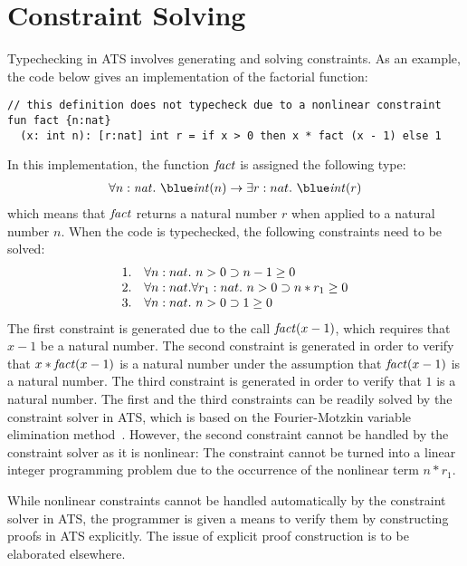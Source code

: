\section{Constraint Solving}
Typechecking in ATS involves generating and solving constraints.  As an
example, the code below gives an implementation of the factorial function:
\begin{verbatim}
// this definition does not typecheck due to a nonlinear constraint
fun fact {n:nat}
  (x: int n): [r:nat] int r = if x > 0 then x * fact (x - 1) else 1
\end{verbatim}
In this implementation, the function ${\it fact}$ is assigned the
following type:
\[\begin{array}{l}
\forall n:\snat.~\tint(n)\timp\exists r:nat.~\tint(r)
\end{array}\]
which means that ${\it fact}$ returns a natural number $r$ when applied to
a natural number $n$. When the code is typechecked, the following
constraints need to be solved:
\[\begin{array}{ll}
1. & \forall n:nat.~n > 0 \supset n - 1 \geq 0 \\
2. & \forall n:nat.\forall r_1:nat.~n > 0 \supset n * r_1 \geq 0 \\
3. & \forall n:nat.~n > 0 \supset 1 \geq 0 \\
\end{array}\]
The first constraint is generated due to the call ${\it fact} (x-1)$, which
requires that $x-1$ be a natural number. The second constraint is generated
in order to verify that $x * {\it fact} (x-1)$ is a natural number under
the assumption that ${\it fact} (x-1)$ is a natural number.  The third
constraint is generated in order to verify that $1$ is a natural number.
The first and the third constraints can be readily solved by the constraint
solver in ATS, which is based on the Fourier-Motzkin variable elimination
method~\cite{DE73}. However, the second constraint cannot be handled by the
constraint solver as it is nonlinear: The constraint cannot be turned into
a linear integer programming problem due to the occurrence of the nonlinear
term $n*r_1$.

While nonlinear constraints cannot be handled automatically by the
constraint solver in ATS, the programmer is given a means to verify them by
constructing proofs in ATS explicitly. The issue of explicit proof
construction is to be elaborated elsewhere.

